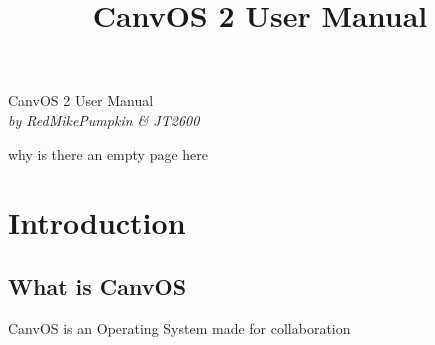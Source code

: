\documentclass{book}
\title{CanvOS 2 User Manual}
\begin{document}
  \begin{titlepage}
  	\begin{center}
  		{\Huge CanvOS 2 User Manual}\\
  		{\footnotesize \textit{}}
  		$ $\\$ $\\$ $\\ %
  		{\LARGE \textit{by RedMikePumpkin \& JT2600}}\\
  	\end{center}
  \end{titlepage}
  why is there an empty page here
  
  \tableofcontents
  
  \renewcommand*\contentsname{Table of Contents}
  
  \chapter{Introduction}
  \section{What is CanvOS}
  CanvOS is an Operating System made for collaboration
  
\end{document}
